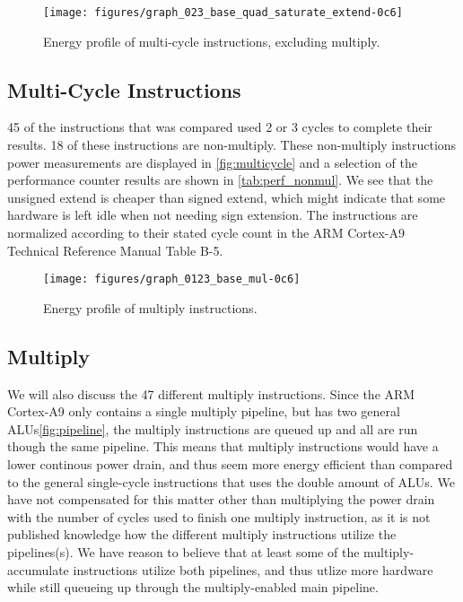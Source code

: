 \begin{figure}
    \centering
    \texttt{[image: figures/graph\_023\_base\_quad\_saturate\_extend-0c6]}
    \caption{Energy profile of multi-cycle instructions, excluding multiply.}
    \label{fig:multicycle}
\end{figure}


\subsection{Multi-Cycle Instructions}


45 of the instructions that was compared used 2 or 3 cycles to complete their results. 18 of these instructions are non-multiply.
These non-multiply instructions power measurements are displayed in \autoref{fig:multicycle} and a selection of the performance counter
results are shown in \autoref{tab:perf_nonmul}. We see that the unsigned extend is cheaper than signed extend, which might indicate
that some hardware is left idle when not needing sign extension. The instructions are normalized according to their stated cycle
count in the ARM Cortex-A9 Technical Reference Manual Table B-5\cite{armtech}.

\begin{figure*}
    \centering
    \texttt{[image: figures/graph\_0123\_base\_mul-0c6]}
    \caption{Energy profile of multiply instructions.}
    \label{fig:allmul}
\end{figure*}

\subsection{Multiply}
We will also discuss the 47 different multiply instructions. Since the ARM
Cortex-A9 only contains a single multiply pipeline, but has two general
ALUs\ref{fig:pipeline}, the multiply instructions are queued up and all are run
though the same pipeline. This means that multiply instructions would have a
lower continous power drain, and thus seem more energy efficient than compared
to the general single-cycle instructions that uses the double amount of ALUs. We
have not compensated for this matter other than multiplying the power drain with
the number of cycles used to finish one multiply instruction, as it is not
published knowledge how the different multiply instructions utilize the
pipelines(s). We have reason to believe that at least some of the
multiply-accumulate instructions utilize both pipelines\cite{ramangcc}, and thus
utlize more hardware while still queueing up through the multiply-enabled main
pipeline.

